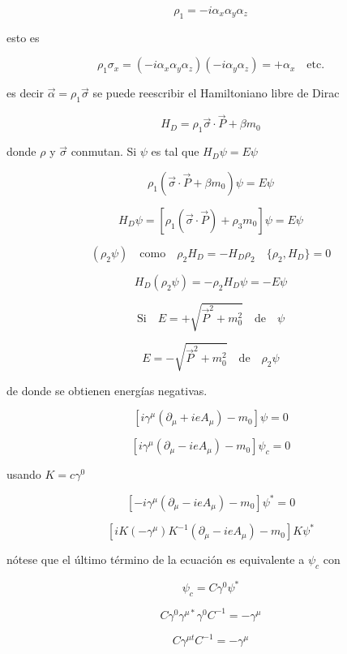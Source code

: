 \documentclass{report}
\begin{document}
\[\rho _1 = -i \alpha_x \alpha_y \alpha_z\]

esto es

\[\rho_1 \sigma_x = (-i \alpha_x \alpha_y \alpha_z) (-i \alpha_y \alpha_z) = + \alpha_x \quad \text{etc.}\]

es decir $\overrightarrow{\alpha} = \rho_1 \overrightarrow{\sigma}$ se puede reescribir el Hamiltoniano libre de Dirac

\begin{equation}
H_{D} = \rho_1 \overrightarrow{\sigma} \cdot \overrightarrow{P} + \beta m_0
\end{equation}

donde $\rho$ y $\overrightarrow{\sigma}$ conmutan. Si $\psi$ es tal que $H_{D} \psi = E \psi$

\[\rho_1 (\overrightarrow{\sigma} \cdot \overrightarrow{P} + \beta m_0) \psi = E \psi \]

\begin{equation}
H_D \psi = [\rho_1 (\overrightarrow{\sigma} \cdot \overrightarrow{P}) + \rho_3 m_0] \psi = E \psi
\end{equation}

\[(\rho_2 \psi) \quad \text{como} \quad \rho_2 H_D = - H_D \rho_2 \quad \lbrace \rho_2 , H_D \rbrace = 0\]

\[H_D(\rho_2 \psi) = - \rho_2 H_D \psi = -E \psi\]

\[\text{Si} \quad E = + \sqrt{\overrightarrow{P}^2 + m_{0}^{2}} \quad \text{de} \quad \psi\]

\[E = - \sqrt{\overrightarrow{P}^2 + m_{0}^{2}} \quad \text{de} \quad \rho_2 \psi\]

de donde se obtienen energías negativas.

\[[i \gamma^{\mu} (\partial_{\mu} + ie A_{\mu}) - m_0] \psi = 0\]

\[[i \gamma^{\mu}(\partial_{\mu} - ie A_{\mu})-m_0] \psi_c = 0\]

usando $K = c \gamma^0$

\[[-i \gamma^{\mu} (\partial_{\mu} -ieA_{\mu})-m_0] \psi^{*} = 0 \]

\[[i K(- \gamma^{\mu}) K^{-1}(\partial_{\mu} - ieA_{\mu})-m_0] K \psi^{*}\]

nótese que el último término de la ecuación es equivalente a $\psi_c$ con

\[\psi_{c} = C \gamma^0 \psi^{*}\]

\[C \gamma^0 \gamma^{\mu *} \gamma^{0} C^{-1} = - \gamma^{\mu}\]

\[C \gamma^{\mu t} C^{-1} = - \gamma^{\mu}\]
\end{document}
